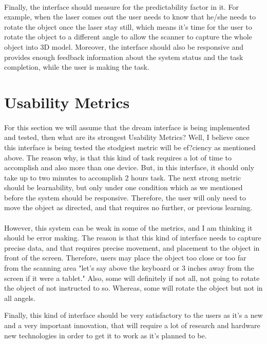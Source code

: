 \documentclass[12pt, oneside]{article}   	%
\begin{document}
\paragraph{}
Finally, the interface should measure for the predictability factor in it.  For example, when the laser comes out the user needs to know that he/she needs to rotate the object once the laser stay still, which means it's time for the user to rotate the object to a different angle to allow the scanner to capture the whole object into 3D model.
Moreover, the interface should also be responsive and provides enough feedback information about the system status and the task completion, while the user is making the task.
\section{Usability Metrics}
\paragraph{}
For this section we will assume that the dream interface is being implemented and tested, then what are its strongest Usability Metrics?  Well, I believe once this interface is being tested the stodgiest metric will be ef?ciency as mentioned above.  The reason why, is that this kind of task requires a lot of time to accomplish and also more than one device. But, in this interface, it should only take up to two minutes to accomplish 2 hours task.  The next strong metric should be learnability, but only under one condition which as we mentioned before the system should be responsive.  Therefore, the user will only need to move the object as directed, and that requires no further, or previous learning. 
\paragraph{}
However, this system can be weak in some of the metrics, and I am thinking it should be error making.  The reason is that this kind of interface needs to capture precise data, and that requires precise movement, and placement to the object in front of the screen.  Therefore, users may place the object too close or too far from the scanning area "let's say above the keyboard or 3 inches away from the screen if it were a tablet."  Also, some will definitely if not all, not going to rotate the object of not instructed to so. Whereas, some will rotate the object but not in all angels.  

Finally, this kind of interface should be very satisfactory to the users as it's a new and a very important innovation, that will require a lot of research and hardware new technologies in order to get it to work as it's planned to be.
\end{document}
